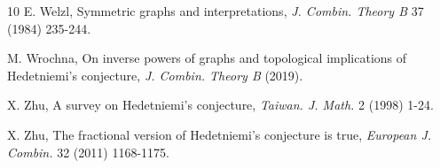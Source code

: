 \documentclass{amsart}
\theoremstyle{definition}
\theoremstyle{remark}
\numberwithin{equation}{section}
\begin{document}
\begin{thebibliography}{10}
E. Welzl, Symmetric graphs and interpretations, \textit{J. Combin. Theory B} 37 (1984) 235-244.

M. Wrochna, On inverse powers of graphs and topological implications of Hedetniemi's conjecture, \textit{J. Combin. Theory B} (2019).


X. Zhu, A survey on Hedetniemi's conjecture, \textit{Taiwan. J. Math.} 2 (1998) 1-24.

X. Zhu, The fractional version of Hedetniemi's conjecture is true, \textit{European J. Combin.} 32 (2011) 1168-1175.

\end{thebibliography}
\end{document}

